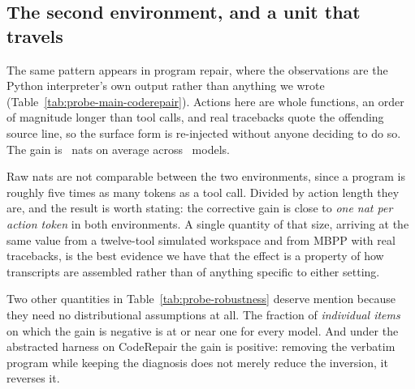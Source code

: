 \subsection{The second environment, and a unit that travels}

The same pattern appears in program repair, where the observations are the
Python interpreter's own output rather than anything we wrote
(Table~\ref{tab:probe-main-coderepair}). Actions here are whole functions, an
order of magnitude longer than tool calls, and real tracebacks quote the
offending source line, so the surface form is re-injected without anyone
deciding to do so. The gain is \MeanGCode\ nats on average across
\NumModelsCode\ models.

Raw nats are not comparable between the two environments, since a program is
roughly five times as many tokens as a tool call. Divided by action length they
are, and the result is worth stating: the corrective gain is close to
\emph{one nat per action token} in both environments. A single quantity of that
size, arriving at the same value from a twelve-tool simulated workspace and from
MBPP with real tracebacks, is the best evidence we have that the effect is a
property of how transcripts are assembled rather than of anything specific to
either setting.

Two other quantities in Table~\ref{tab:probe-robustness} deserve mention because
they need no distributional assumptions at all. The fraction of \emph{individual
items} on which the gain is negative is at or near one for every model. And
under the abstracted harness on CodeRepair the gain is positive: removing the verbatim program while keeping the
diagnosis does not merely reduce the inversion, it reverses it.



